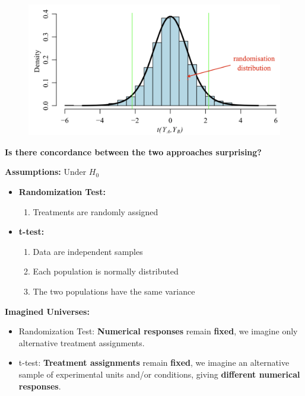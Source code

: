 \documentclass[14pt]{extarticle}
\begin{document}
\begin{figure}[H]
    \centering
    \includegraphics[width=1\textwidth]{fig18.png}
\end{figure}

\newpage

\textbf{Is there concordance between the two approaches surprising?}

\textbf{Assumptions: }Under $H_0$

\begin{itemize}
    \item \textbf{Randomization Test:}
    \begin{enumerate}
        \item Treatments are randomly assigned
    \end{enumerate}
    
    \item \textbf{t-test:}
    \begin{enumerate}
        \item Data are independent samples
        \item Each population is normally distributed
        \item The two populations have the same variance
    \end{enumerate}
\end{itemize}

\textbf{Imagined Universes:}

\begin{itemize}
    \item Randomization Test: \textbf{Numerical responses} remain \textbf{fixed}, we imagine only alternative treatment assignments.

    \item t-test: \textbf{Treatment assignments} remain \textbf{fixed}, we imagine an alternative sample of experimental units and/or conditions, giving \textbf{different numerical responses}.
\end{itemize}
\end{document}
